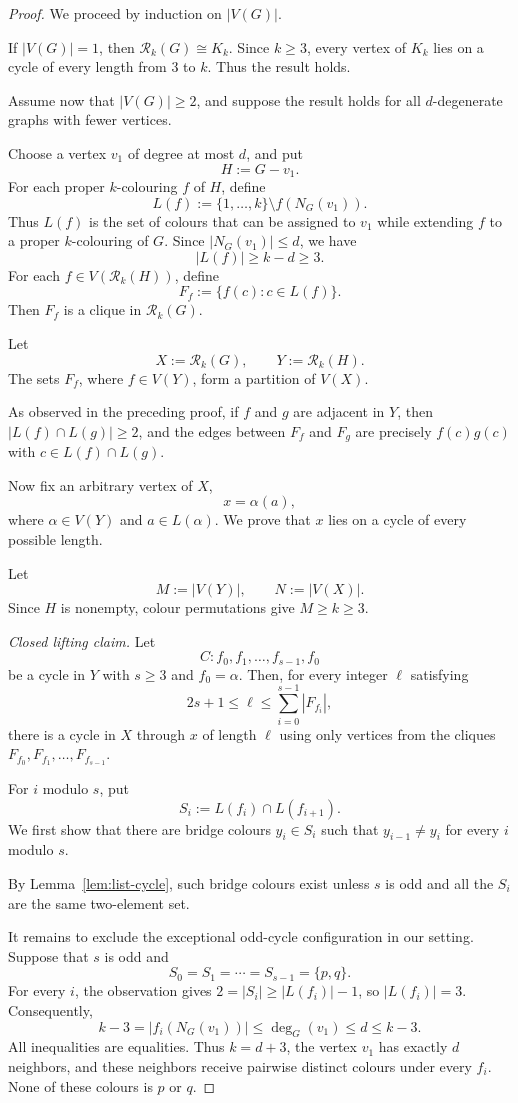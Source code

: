 \documentclass[11pt]{article}
\theoremstyle{remark}
\newcommand{\Rk}{\mathcal R_k}
\numberwithin{equation}{section}
\numberwithin{table}{section}
\begin{document}
\begin{proof}
We proceed by induction on $|V(G)|$.

If $|V(G)|=1$, then $\Rk(G)\cong K_k$. Since $k\ge 3$,
every vertex of $K_k$ lies on a cycle of every length from $3$ to $k$.
Thus the result holds.

Assume now that $|V(G)|\ge 2$, and suppose the result holds for all
$d$-degenerate graphs with fewer vertices.

Choose a vertex $v_1$ of degree at most $d$, and put
\[
H:=G-v_1.
\]
For each proper $k$-colouring $f$ of $H$, define
\[
L(f):=\{1,\ldots,k\}\setminus f(N_G(v_1)).
\]
Thus $L(f)$ is the set of colours that can be assigned to $v_1$ while
extending $f$ to a proper $k$-colouring of $G$. Since
$|N_G(v_1)|\le d$, we have
\[
|L(f)|\ge k-d\ge 3.
\]
For each $f\in V(\Rk(H))$, define
\[
F_f:=\{f(c):c\in L(f)\}.
\]
Then $F_f$ is a clique in $\Rk(G)$.

Let
\[
X:=\Rk(G),\qquad Y:=\Rk(H).
\]
The sets $F_f$, where $f\in V(Y)$, form a partition of $V(X)$.

As observed in the preceding proof, if $f$ and $g$ are adjacent in $Y$,
then $|L(f)\cap L(g)|\ge 2$, and the edges between $F_f$ and $F_g$ are
precisely $f(c)g(c)$ with $c\in L(f)\cap L(g)$.

Now fix an arbitrary vertex of $X$,
\[
x=\alpha(a),
\]
where $\alpha\in V(Y)$ and $a\in L(\alpha)$.
We prove that $x$ lies on a cycle of every possible length.

Let
\[
M:=|V(Y)|,\qquad N:=|V(X)|.
\]
Since $H$ is nonempty, colour permutations give $M\ge k\ge3$.

\smallskip

\noindent\textit{Closed lifting claim.}
Let
\[
C:f_0,f_1,\ldots,f_{s-1},f_0
\]
be a cycle in $Y$ with $s\ge3$ and $f_0=\alpha$. Then, for every integer $\ell$
satisfying
\[
2s+1\le \ell\le \sum_{i=0}^{s-1}|F_{f_i}|,
\]
there is a cycle in $X$ through $x$ of length $\ell$ using only vertices
from the cliques $F_{f_0},F_{f_1},\ldots,F_{f_{s-1}}$.

For $i$ modulo $s$, put
\[
S_i:=L(f_i)\cap L(f_{i+1}).
\]
We first show that there are bridge colours $y_i\in S_i$ such that
$y_{i-1}\ne y_i$ for every $i$ modulo $s$.

By Lemma~\ref{lem:list-cycle}, such bridge colours exist unless $s$
is odd and all the $S_i$ are the same two-element set.

It remains to exclude the exceptional odd-cycle configuration in our
setting. Suppose that $s$ is odd and
\[
S_0=S_1=\cdots=S_{s-1}=\{p,q\}.
\]
For every $i$, the observation gives
$2=|S_i|\ge |L(f_i)|-1$, so $|L(f_i)|=3$. Consequently,
\[
k-3=|f_i(N_G(v_1))|\le \deg_G(v_1)\le d\le k-3.
\]
All inequalities are equalities. Thus $k=d+3$, the vertex $v_1$ has
exactly $d$ neighbors, and these neighbors receive pairwise distinct
colours under every $f_i$. None of these colours is $p$ or $q$.


\end{proof}
\end{document}
